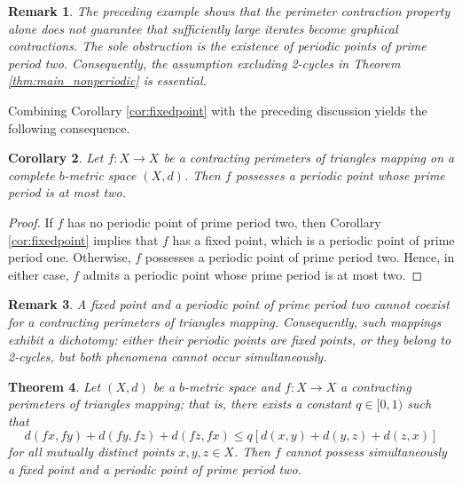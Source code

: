 \documentclass[a4paper,12pt,oneside]{article}
\newtheorem{theorem}{Theorem}[section]
\newtheorem{corollary}[theorem]{Corollary}
\newtheorem{remark}[theorem]{Remark}
\numberwithin{equation}{section}
\begin{document}
\begin{remark}
The preceding example shows that the perimeter contraction property alone does not guarantee that sufficiently large iterates become graphical contractions. The sole obstruction is the existence of periodic points of prime period two. Consequently, the assumption excluding 2-cycles in Theorem \ref{thm:main_nonperiodic} is essential.
\end{remark}

Combining Corollary \ref{cor:fixedpoint} with the preceding discussion yields the following consequence.

\begin{corollary}
\label{cor:periodic_atmost2}
Let $f:X\to X$ be a  contracting perimeters of triangles mapping on a complete $b$-metric space $(X,d)$. Then $f$ possesses a periodic point whose prime period is at most two.
\end{corollary}

\begin{proof}
If $f$ has no periodic point of prime period two, then Corollary \ref{cor:fixedpoint} implies that $f$ has a fixed point, which is a periodic point of prime period one. Otherwise, $f$ possesses a periodic point of prime period two. Hence, in either case, $f$ admits a periodic point whose prime period is at most two.
\end{proof}

\begin{remark}
A fixed point and a periodic point of prime period two cannot coexist for a  contracting perimeters of triangles mapping. Consequently, such mappings exhibit a dichotomy: either their periodic points are fixed points, or they belong to 2-cycles, but both phenomena cannot occur simultaneously.
\end{remark}

\begin{theorem}
\label{thm:no_fixed_with_2cycle}
Let $(X,d)$ be a $b$-metric space and $f:X\to X$  a contracting perimeters of triangles mapping; that is, there exists a constant $q\in [0,1)$ such that
\[
d(fx,fy) + d(fy,fz) + d(fz,fx)\leq q[d(x,y) + d(y,z) + d(z,x)]
\]
for all mutually distinct points $x,y,z\in X$. Then $f$ cannot possess simultaneously a fixed point and a periodic point of prime period two.
\end{theorem}
\end{document}
